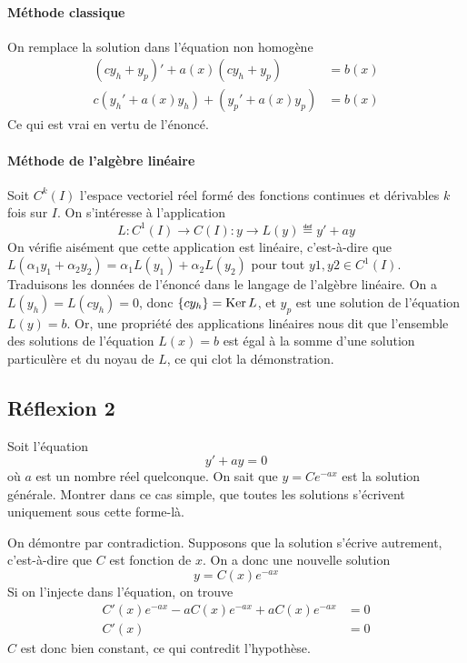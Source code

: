 \begin{solution}
    \paragraph{Méthode classique}
    On remplace la solution dans l'équation non homogène
    \begin{align*}
    (c y_h + y_p)' + a(x) (c y_h + y_p) &= b(x) \\
    c (y_h' + a(x) y_h) + (y_p' + a(x) y_p) &= b(x)
    \end{align*}
    Ce qui est vrai en vertu de l'énoncé.
    \paragraph{Méthode de l'algèbre linéaire}
    Soit $C^k(I)$ l'espace vectoriel réel formé des fonctions continues et dérivables $k$ fois sur $I$. On s'intéresse à l'application 
    \[ L: C^1(I) \rightarrow C(I) : y \rightarrow L(y) \eqdef y' + ay \]
    On vérifie aisément que cette application est linéaire, c'est-à-dire que $L(\alpha_1 y_1 + \alpha_2 y_2) = \alpha_1 L(y_1) + \alpha_2 L(y_2)$ pour tout $y1, y2 \in C^1(I)$. Traduisons les données de l'énoncé dans le langage de l'algèbre linéaire. On a $L(y_h) = L(c y_h) = 0$, donc $\{c y_h\} = \operatorname{Ker} L$, et $y_p$ est une solution de l'équation $L(y) = b$. Or, une propriété des applications linéaires nous dit que l'ensemble des solutions de l'équation $L(x) = b$ est égal à la somme d'une solution particulère et du noyau de $L$, ce qui clot la démonstration.
\end{solution}

\subsection{Réflexion 2}
Soit l'équation
\[ y' + ay = 0 \]
où $a$ est un nombre réel quelconque. On sait que $y = Ce^{-ax}$ est la solution générale. Montrer dans ce cas simple, que toutes les solutions s'écrivent uniquement sous cette forme-là.

\begin{solution}
    On démontre par contradiction. Supposons que la solution s'écrive autrement, c'est-à-dire que $C$ est fonction de $x$. On a donc une nouvelle solution
    \[ y = C(x) e^{-ax} \]
    Si on l'injecte dans l'équation, on trouve
    \begin{align*}
    C'(x) e^{-ax} - a C(x) e^{-ax} + a C(x) e^{-ax} &= 0 \\
    C'(x) &= 0
    \end{align*}
    $C$ est donc bien constant, ce qui contredit l'hypothèse. 
\end{solution}

